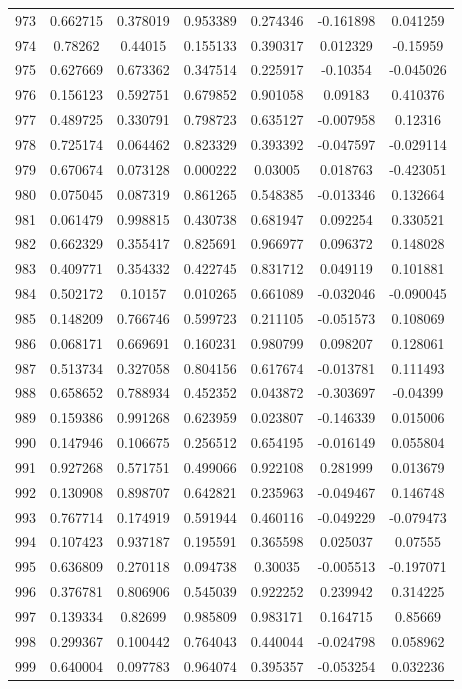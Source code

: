 \begin{table}
\begin{tabular}{c|c|c|c|c|c|c}
973 & 0.662715 & 0.378019 & 0.953389 & 0.274346 & -0.161898 & 0.041259\\
974 & 0.78262 & 0.44015 & 0.155133 & 0.390317 & 0.012329 & -0.15959\\
975 & 0.627669 & 0.673362 & 0.347514 & 0.225917 & -0.10354 & -0.045026\\
976 & 0.156123 & 0.592751 & 0.679852 & 0.901058 & 0.09183 & 0.410376\\
977 & 0.489725 & 0.330791 & 0.798723 & 0.635127 & -0.007958 & 0.12316\\
978 & 0.725174 & 0.064462 & 0.823329 & 0.393392 & -0.047597 & -0.029114\\
979 & 0.670674 & 0.073128 & 0.000222 & 0.03005 & 0.018763 & -0.423051\\
980 & 0.075045 & 0.087319 & 0.861265 & 0.548385 & -0.013346 & 0.132664\\
981 & 0.061479 & 0.998815 & 0.430738 & 0.681947 & 0.092254 & 0.330521\\
982 & 0.662329 & 0.355417 & 0.825691 & 0.966977 & 0.096372 & 0.148028\\
983 & 0.409771 & 0.354332 & 0.422745 & 0.831712 & 0.049119 & 0.101881\\
984 & 0.502172 & 0.10157 & 0.010265 & 0.661089 & -0.032046 & -0.090045\\
985 & 0.148209 & 0.766746 & 0.599723 & 0.211105 & -0.051573 & 0.108069\\
986 & 0.068171 & 0.669691 & 0.160231 & 0.980799 & 0.098207 & 0.128061\\
987 & 0.513734 & 0.327058 & 0.804156 & 0.617674 & -0.013781 & 0.111493\\
988 & 0.658652 & 0.788934 & 0.452352 & 0.043872 & -0.303697 & -0.04399\\
989 & 0.159386 & 0.991268 & 0.623959 & 0.023807 & -0.146339 & 0.015006\\
990 & 0.147946 & 0.106675 & 0.256512 & 0.654195 & -0.016149 & 0.055804\\
991 & 0.927268 & 0.571751 & 0.499066 & 0.922108 & 0.281999 & 0.013679\\
992 & 0.130908 & 0.898707 & 0.642821 & 0.235963 & -0.049467 & 0.146748\\
993 & 0.767714 & 0.174919 & 0.591944 & 0.460116 & -0.049229 & -0.079473\\
994 & 0.107423 & 0.937187 & 0.195591 & 0.365598 & 0.025037 & 0.07555\\
995 & 0.636809 & 0.270118 & 0.094738 & 0.30035 & -0.005513 & -0.197071\\
996 & 0.376781 & 0.806906 & 0.545039 & 0.922252 & 0.239942 & 0.314225\\
997 & 0.139334 & 0.82699 & 0.985809 & 0.983171 & 0.164715 & 0.85669\\
998 & 0.299367 & 0.100442 & 0.764043 & 0.440044 & -0.024798 & 0.058962\\
999 & 0.640004 & 0.097783 & 0.964074 & 0.395357 & -0.053254 & 0.032236\\
\end{tabular}
\end{table}